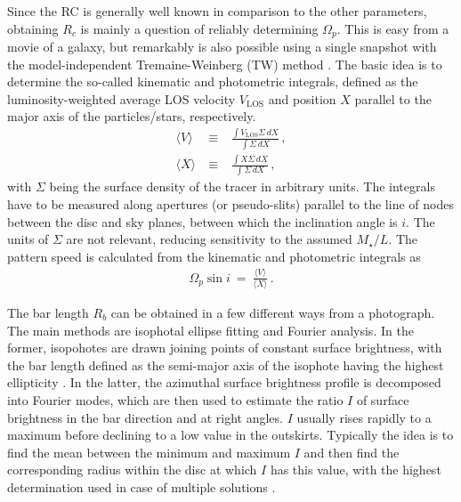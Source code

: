 \documentclass[fleqn,usenatbib,useAMS,onecolumn]{mnras} %
\begin{document}
Since the RC is generally well known in comparison to the other parameters, obtaining $R_c$ is mainly a question of reliably determining $\Omega_p$. This is easy from a movie of a galaxy, but remarkably is also possible using a single snapshot with the model-independent Tremaine-Weinberg (TW) method \citep{Tremaine_1984}. The basic idea is to determine the so-called kinematic and photometric integrals, defined as the luminosity-weighted average LOS velocity $V_{\text{LOS}}$ and position $X$ parallel to the major axis of the particles/stars, respectively.
\begin{eqnarray}
    \langle V \rangle ~&\equiv&~ \frac{\int V_{\text{LOS}} \Sigma \, dX}{\int \Sigma \, dX} \, , \\
    \langle X \rangle ~&\equiv&~ \frac{\int X \Sigma \, dX}{\int \Sigma \, dX} \, ,
\end{eqnarray}
with $\Sigma$ being the surface density of the tracer in arbitrary units. The integrals have to be measured along apertures (or pseudo-slits) parallel to the line of nodes between the disc and sky planes, between which the inclination angle is $i$. The units of $\Sigma$ are not relevant, reducing sensitivity to the assumed $M_{\star}/L$. The pattern speed is calculated from the kinematic and photometric integrals as
\begin{eqnarray}
	\Omega_p \sin i ~=~ \frac{\langle V \rangle}{\langle X \rangle} \, .
\end{eqnarray}

The bar length $R_b$ can be obtained in a few different ways from a photograph. The main methods are isophotal ellipse fitting and Fourier analysis. In the former, isopohotes are drawn joining points of constant surface brightness, with the bar length defined as the semi-major axis of the isophote having the highest ellipticity \citep{Aguerri_2009}. In the latter, the azimuthal surface brightness profile is decomposed into Fourier modes, which are then used to estimate the ratio $I$ of surface brightness in the bar direction and at right angles. $I$ usually rises rapidly to a maximum before declining to a low value in the outskirts. Typically the idea is to find the mean between the minimum and maximum $I$ and then find the corresponding radius within the disc at which $I$ has this value, with the highest determination used in case of multiple solutions \citep{Aguerri_2000}.
\end{document}

